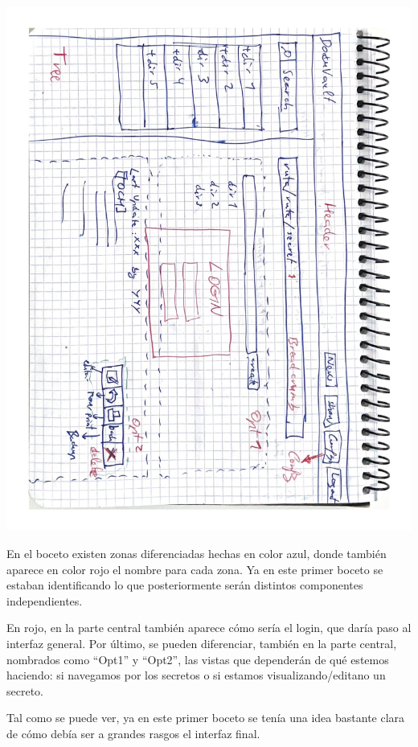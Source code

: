 \documentclass{\ClassPath/viu-tfm-template}
\begin{document}
\vspace{-20pt}
\begin{center}
    \includegraphics[angle=90,width=\linewidth]{img/boceto.pdf}
    \vspace{-20pt}
\end{center}

En el boceto existen zonas diferenciadas hechas en color azul, donde también aparece en color rojo el nombre para cada zona. Ya en este primer boceto se estaban identificando lo que posteriormente serán distintos componentes independientes.

En rojo, en la parte central también aparece cómo sería el login, que daría paso al interfaz general. Por último, se pueden diferenciar, también en la parte central, nombrados como “Opt1” y “Opt2”, las vistas que dependerán de qué estemos haciendo: si navegamos por los secretos o si estamos visualizando/editano un secreto.

Tal como se puede ver, ya en este primer boceto se tenía una idea bastante clara de cómo debía ser a grandes rasgos el interfaz final.
\end{document}
